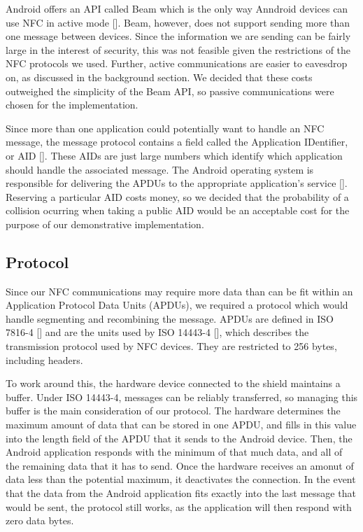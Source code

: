 \documentclass[12pt]{report}
\begin{document}
Android offers an API called Beam which is the only way Anndroid devices can use NFC in active mode []. Beam,
however, does not support sending more than one message between devices. Since the information we are sending can be
fairly large in the interest of security, this was not feasible given the restrictions of the NFC protocols we used.
Further, active communications are easier to eavesdrop on, as discussed in the background section. We decided that these
costs outweighed the simplicity of the Beam API, so passive communications were chosen for the implementation.

Since more than one application could potentially want to handle an NFC message, the message protocol contains a field
called the Application IDentifier, or AID []. These AIDs are just large numbers which identify which application should
handle the associated message. The Android operating system is responsible for delivering the APDUs to the
appropriate application's service []. Reserving a particular AID costs money, so we decided that the probability of a
collision ocurring when taking a public AID would be an acceptable cost for the purpose of our demonstrative
implementation.


\subsection{Protocol}

Since our NFC communications may require more data than can be fit within an Application Protocol Data Units (APDUs), we
required a protocol which would handle segmenting and recombining the message. APDUs are defined in ISO 7816-4 [] and are
the units used by ISO 14443-4 [], which describes the transmission protocol used by NFC devices. They are restricted to
256 bytes, including headers.

To work around this, the hardware device connected to the shield maintains a buffer. Under ISO 14443-4, messages can be
reliably transferred, so managing this buffer is the main consideration of our protocol. The hardware determines the
maximum amount of data that can be stored in one APDU, and fills in this value into the length field of the APDU that it
sends to the Android device. Then, the Android application responds with the minimum of that much data,  and all of the
remaining data that it has to send. Once the hardware receives an amonut of data less than the potential maximum, it
deactivates the connection. In the event that the data from the Android application fits exactly into the last message
that would be sent, the protocol still works, as the application will then respond with zero data bytes.
\end{document}
